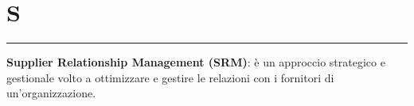 \section*{S}
{\color{lightgray}\rule{\textwidth}{0.4pt}} %
\begin{glossaryitemize}
    \item \textbf{Supplier Relationship Management (SRM)}: è un approccio strategico e gestionale volto a ottimizzare e gestire le relazioni con i fornitori di un'organizzazione.
\end{glossaryitemize}

